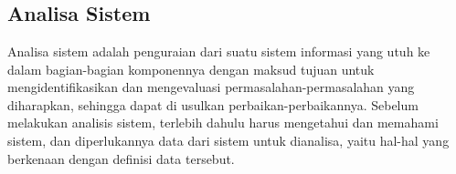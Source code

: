 %


%


\chapter{\babEmpat}
\section{Analisa Sistem}
\par Analisa sistem adalah penguraian dari suatu sistem informasi yang utuh ke dalam bagian-bagian komponennya dengan maksud tujuan untuk mengidentifikasikan dan mengevaluasi permasalahan-permasalahan yang diharapkan, sehingga dapat di usulkan perbaikan-perbaikannya. Sebelum melakukan analisis sistem, terlebih dahulu harus mengetahui dan memahami sistem, dan diperlukannya data dari sistem untuk dianalisa, yaitu hal-hal yang berkenaan dengan definisi data tersebut.
